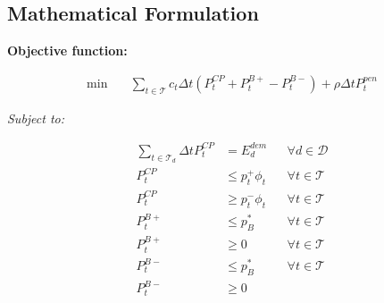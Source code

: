 \documentclass{article}
\begin{document}
\subsection*{Mathematical Formulation}

\textbf{Objective function:}

\begin{align}
      \min \quad & \sum_{t \in \mathcal{T}} c_{t} \Delta t (P^{CP}_{t} + P^{B+}_t - P^{B-}_t) + \rho \Delta t P^{pen}_t
\end{align}

\textit{Subject to:}

\begin{align}
      \sum_{t \in \mathcal{T}_d} \Delta t P^{CP}_{t} & =  E^{dem}_{d}
                                                     &                                                                                                & \forall d \in \mathcal{D} \\
      P^{CP}_{t}                                     & \le p^{+}_t \phi_{t}
                                                     &                                                                                                & \forall t \in \mathcal{T} \\
      P^{CP}_{t}                                     & \ge p^{-}_t \phi_{t}
                                                     &                                                                                                & \forall t \in \mathcal{T} \\
      P^{B+}_{t}                                     & \le p^{*}_B
                                                     &                                                                                                & \forall t \in \mathcal{T} \\
      P^{B+}_{t}                                     & \ge 0
                                                     &                                                                                                & \forall t \in \mathcal{T} \\
      P^{B-}_{t}                                     & \le p^{*}_B
                                                     &                                                                                                & \forall t \in \mathcal{T} \\
      P^{B-}_{t}                                     & \ge 0

\end{align}
\end{document}
